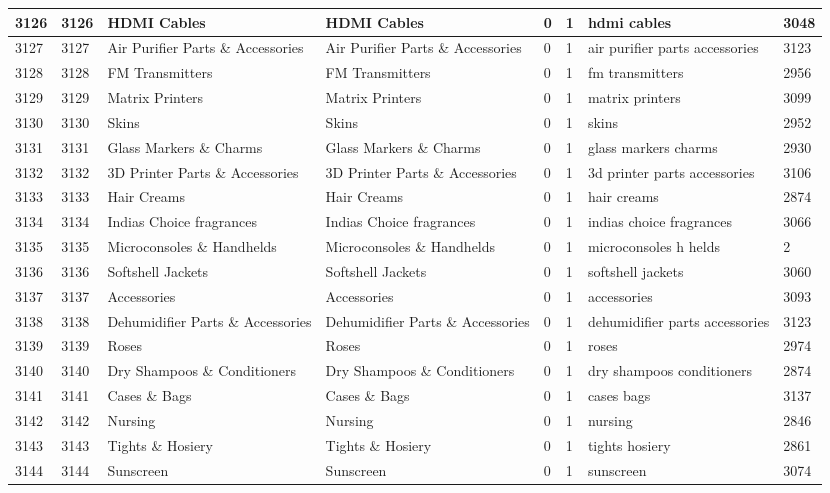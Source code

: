 \begin{longtable}{|l|l|l|l|l|l|l|l|}
3126 & 3126 & HDMI Cables & HDMI Cables & 0 & 1 & hdmi cables & 3048 \\ \hline 
3127 & 3127 & Air Purifier Parts \& Accessories & Air Purifier Parts \& Accessories & 0 & 1 & air purifier parts accessories & 3123 \\ \hline 
3128 & 3128 & FM Transmitters & FM Transmitters & 0 & 1 & fm transmitters & 2956 \\ \hline 
3129 & 3129 & Matrix Printers & Matrix Printers & 0 & 1 & matrix printers & 3099 \\ \hline 
3130 & 3130 & Skins & Skins & 0 & 1 & skins & 2952 \\ \hline 
3131 & 3131 & Glass Markers \& Charms & Glass Markers \& Charms & 0 & 1 & glass markers charms & 2930 \\ \hline 
3132 & 3132 & 3D Printer Parts \& Accessories & 3D Printer Parts \& Accessories & 0 & 1 & 3d printer parts accessories & 3106 \\ \hline 
3133 & 3133 & Hair Creams & Hair Creams & 0 & 1 & hair creams & 2874 \\ \hline 
3134 & 3134 & Indias Choice fragrances & Indias Choice fragrances & 0 & 1 & indias choice fragrances & 3066 \\ \hline 
3135 & 3135 & Microconsoles \& Handhelds & Microconsoles \& Handhelds & 0 & 1 & microconsoles h helds & 2 \\ \hline 
3136 & 3136 & Softshell Jackets & Softshell Jackets & 0 & 1 & softshell jackets & 3060 \\ \hline 
3137 & 3137 & Accessories & Accessories & 0 & 1 & accessories & 3093 \\ \hline 
3138 & 3138 & Dehumidifier Parts \& Accessories & Dehumidifier Parts \& Accessories & 0 & 1 & dehumidifier parts accessories & 3123 \\ \hline 
3139 & 3139 & Roses & Roses & 0 & 1 & roses & 2974 \\ \hline 
3140 & 3140 & Dry Shampoos \& Conditioners & Dry Shampoos \& Conditioners & 0 & 1 & dry shampoos conditioners & 2874 \\ \hline 
3141 & 3141 & Cases \& Bags & Cases \& Bags & 0 & 1 & cases bags & 3137 \\ \hline 
3142 & 3142 & Nursing & Nursing & 0 & 1 & nursing & 2846 \\ \hline 
3143 & 3143 & Tights \& Hosiery & Tights \& Hosiery & 0 & 1 & tights hosiery & 2861 \\ \hline 
3144 & 3144 & Sunscreen & Sunscreen & 0 & 1 & sunscreen & 3074 \\ \hline 

\end{longtable}
